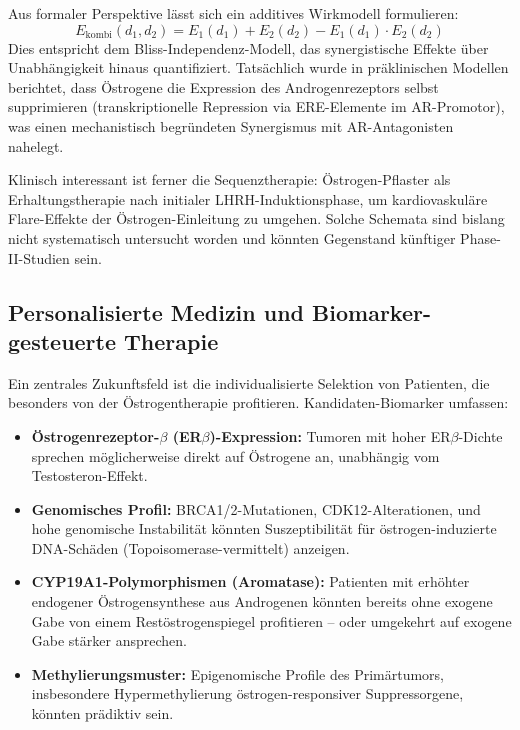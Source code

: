 ﻿\documentclass[a4paper,12pt]{article}
\theoremstyle{definition}
\begin{document}
Aus formaler Perspektive lässt sich ein additives Wirkmodell formulieren:
\begin{equation}
  E_{\mathrm{kombi}}(d_1, d_2) = E_1(d_1) + E_2(d_2) - E_1(d_1) \cdot E_2(d_2)
\end{equation}
Dies entspricht dem Bliss-Independenz-Modell, das synergistische Effekte über Unabhängig\-keit hinaus quantifiziert.
Tatsächlich wurde in präklinischen Modellen berichtet, dass Östrogene die Expression des Androgenrezeptors selbst supprimieren (transkriptionelle Repression via ERE-Elemente im AR-Promotor), was einen mechanistisch begründeten Synergismus mit AR-Antagonisten nahelegt.

Klinisch interessant ist ferner die Sequenztherapie: Östrogen-Pflaster als Erhaltungstherapie nach initialer LHRH-Induktionsphase, um kardiovaskuläre Flare-Effekte der Östrogen-Einleitung zu umgehen.
Solche Schemata sind bislang nicht systematisch untersucht worden und könnten Gegenstand künftiger Phase-II-Studien sein.

\subsection{Personalisierte Medizin und Biomarker-gesteuerte Therapie}

Ein zentrales Zukunftsfeld ist die individualisierte Selektion von Patienten, die besonders von der Östrogentherapie profitieren.
Kandidaten-Biomarker umfassen:
\begin{itemize}
  \item \textbf{Östrogenrezeptor-$\beta$ (ER$\beta$)-Expression:} Tumoren mit hoher ER$\beta$-Dichte sprechen möglicherweise direkt auf Östrogene an, unabhängig vom Testosteron-Effekt.
  \item \textbf{Genomisches Profil:} BRCA1/2-Mutationen, CDK12-Alterationen, und hohe genomische Instabilität könnten Suszeptibilität für östrogen-induzierte DNA-Schäden (Topoisomerase-vermittelt) anzeigen.
  \item \textbf{CYP19A1-Polymorphismen (Aromatase):} Patienten mit erhöhter endogener Östrogensynthese aus Androgenen könnten bereits ohne exogene Gabe von einem Restöstrogenspiegel profitieren -- oder umgekehrt auf exogene Gabe stärker ansprechen.
  \item \textbf{Methylierungsmuster:} Epigenomische Profile des Primärtumors, insbesondere Hypermethylierung östrogen-responsiver Suppressorgene, könnten prädiktiv sein.
\end{itemize}
\end{document}
